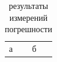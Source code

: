 \begin{table}
  \caption{результаты измерений погрешности} %
  \label{tab:results}
  \begin{tabular}{ll}
    а & б \\
  \end{tabular}
\end{table}
